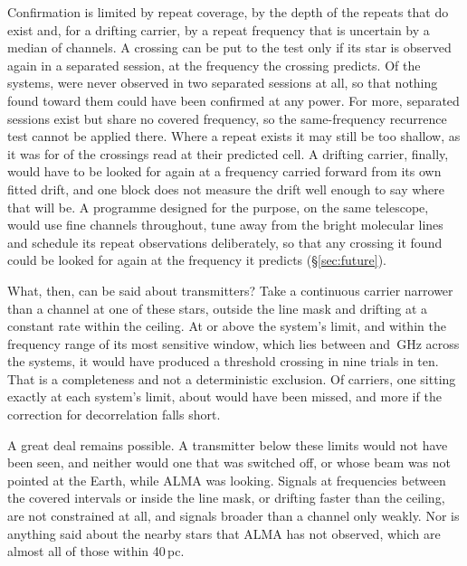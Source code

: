 Confirmation is limited by repeat coverage, by the depth of
the repeats that do exist and, for a drifting carrier, by a repeat
frequency that is uncertain by a median of \ZtRegChanMed{} channels. A
crossing can be put to the test only if its star is observed again in a
separated session, at the frequency the crossing predicts. Of the
\NSysClassA{} systems, \ZcNoRepNoSep{} were never observed in two separated
sessions at all, so that nothing found toward them could have been confirmed
at any power. For \ZcNoRepNoFreqWord{} more, separated sessions exist but
share no covered frequency, so the same-frequency recurrence test cannot be
applied there. Where a repeat exists it may still be too shallow, as it was
for \HjNPowerLo{} of the \RcNExcl{} crossings read at their predicted cell.
A drifting carrier, finally, would have to be looked for again at a
frequency carried forward from its own fitted drift, and one block does not
measure the drift well enough to say where that will be. A programme designed for the purpose, on the same telescope,
would use fine channels throughout, tune away from the bright molecular
lines and schedule its repeat observations deliberately, so that any
crossing it found could be looked for again at the frequency it predicts
(\S\ref{sec:future}).

What, then, can be said about transmitters? Take a continuous carrier
narrower than a channel at one of these stars, outside the line mask and
drifting at a constant rate within the ceiling. At or above the system's limit, and within the
frequency range of its most sensitive window, which lies between
\NtBestNuLo{} and \NtBestNuHi\,GHz across the systems, it would have
produced a threshold crossing in nine trials in ten. That is a completeness and not a
deterministic exclusion. Of \NSysALimSum{} carriers, one sitting exactly at
each system's limit, about \NtMissAtLimWord{} would have been missed, and
more if the correction for decorrelation falls short.

A great deal remains possible. A transmitter below these limits would not have been seen,
and neither would one that was switched off, or whose beam was not pointed
at the Earth, while ALMA was looking. Signals at frequencies between the
covered intervals or inside the line mask, or drifting faster than the
ceiling, are not constrained at all, and signals broader than a channel only
weakly. Nor is anything said
about the nearby stars that ALMA has not observed, which are almost all of
those within 40\,pc.

